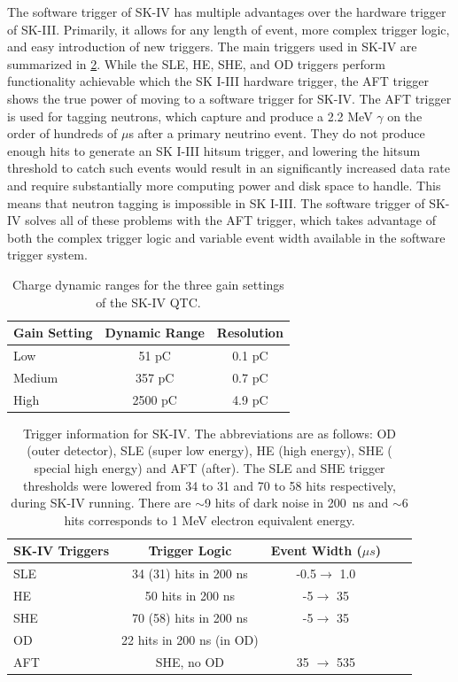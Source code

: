 The software trigger of SK-IV has multiple advantages over the hardware trigger of SK-III.  Primarily, it allows for any length of event, more complex trigger logic, and easy introduction of new triggers.  The main triggers used in SK-IV are summarized in \cref{tab:triggertable4}.  While the SLE, HE, SHE, and OD triggers perform functionality achievable which the SK I-III hardware trigger, the AFT trigger shows the true power of moving to a software trigger for SK-IV.  The AFT trigger is used for tagging neutrons, which capture and produce a 2.2 MeV $\gamma$ on the order of hundreds of $\mu$s after a primary neutrino event.  They do not produce enough hits to generate an SK I-III hitsum trigger, and lowering the hitsum threshold to catch such events would result in an significantly increased data rate and require substantially more computing power and disk space to handle.  This means that neutron tagging is impossible in SK I-III.  The software trigger of SK-IV solves all of these problems with the AFT trigger, which takes advantage of both the complex trigger logic and variable event width available in the software trigger system.    

\begin{table}
\centering
	\begin{tabular}{lcc}
	\hline \hline
	Gain Setting&Dynamic Range&Resolution\\
	\hline
	Low&51 pC&0.1 pC\\
	Medium&357 pC&0.7 pC\\
	High&2500 pC& 4.9 pC\\
   \hline \hline
	\end{tabular}
\caption{Charge dynamic ranges for the three gain settings of the SK-IV QTC.}
\label{tab:QTC_dynamic_ranges}
\end{table}

\begin{table}[!ht]
\centering
\begin{tabular}{lcccc}
\hline \hline
SK-IV Triggers & Trigger Logic & Event Width ($\mu s$) \\
\hline
SLE & 34 (31) hits in 200 ns & -0.5$\rightarrow$ 1.0 \\
HE & 50 hits in 200 ns & -5$\rightarrow$ 35 \\
SHE & 70 (58) hits in 200 ns & -5$\rightarrow$ 35\\
OD & 22 hits in 200 ns (in OD) & \\
AFT & SHE, no OD & 35 $\rightarrow$ 535 \\
\hline \hline
\end{tabular}
\caption{Trigger information for SK-IV. The abbreviations are as follows: 
OD (outer detector), SLE (super low energy), HE (high energy), SHE (
special high energy) and AFT (after).  The SLE and SHE trigger thresholds were lowered from 34 to 31 and 70 to 58 hits respectively, during SK-IV running.  There are $\sim$9 hits of dark noise 
in 200~ns and $\sim$6 hits corresponds to 1 MeV electron equivalent energy.}
\label{tab:triggertable4}
\end{table}


